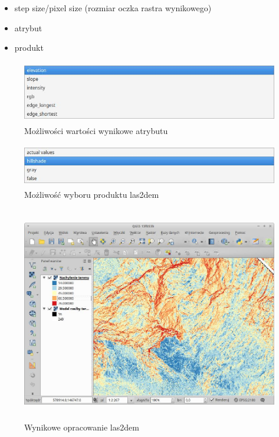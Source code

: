 \documentclass[12pt,a4paper]{book}
\begin{document}
\begin{itemize}
\item step size/pixel size (rozmiar oczka rastra wynikowego)
\item atrybut
\item produkt
\end{itemize}


\begin{center}
\begin{figure}
\includegraphics[width=13cm,height=2.72cm]{005-atrybut.jpg}
\caption{Możliwości wartości wynikowe atrybutu}
\end{figure}
\end{center}


\begin{center}
\begin{figure}
\includegraphics[width=13cm,height=1.831cm]{005-produkt.jpg}
\caption{Możliwość wyboru produktu las2dem}
\end{figure}
\end{center}

\begin{center}
\begin{figure}
\includegraphics[width=13cm,height=9.419cm]{005-lasdem-wynik.jpg}
\caption{Wynikowe opracowanie las2dem}
\end{figure}
\end{center}
\end{document}
